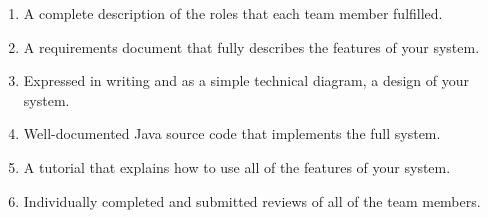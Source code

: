 \vspace*{-.1in}
\begin{enumerate}
  \setlength{\itemsep}{0in}
  \item A complete description of the roles that each team member fulfilled.
  \item A requirements document that fully describes the features of your system.
  \item Expressed in writing and as a simple technical diagram, a design of your system.
  \item Well-documented Java source code that implements the full system.
  \item A tutorial that explains how to use all of the features of your system.
  \item Individually completed and submitted reviews of all of the team members.
\end{enumerate}
\vspace*{-.1in}


